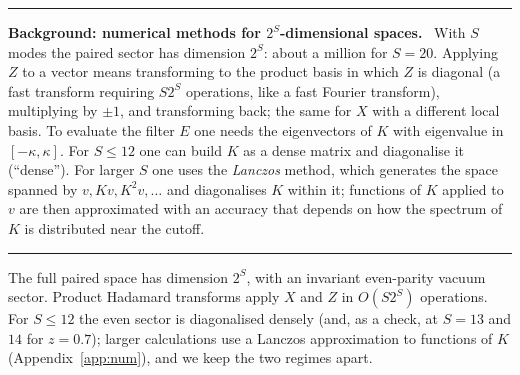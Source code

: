 \documentclass[11pt,a4paper]{article}
\newenvironment{background}[1]{\par\medskip\noindent\hrule\smallskip\noindent\textbf{Background: #1.}\ \ignorespaces}{\par\smallskip\noindent\hrule\medskip}
\begin{document}
\begin{background}{numerical methods for $2^S$-dimensional spaces}
With $S$ modes the paired sector has dimension $2^S$: about a million for $S=20$. Applying $Z$ to a vector means transforming to the product basis in which $Z$ is diagonal (a fast transform requiring $S2^S$ operations, like a fast Fourier transform), multiplying by $\pm1$, and transforming back; the same for $X$ with a different local basis. To evaluate the filter $E$ one needs the eigenvectors of $K$ with eigenvalue in $[-\kappa,\kappa]$. For $S\le12$ one can build $K$ as a dense matrix and diagonalise it (``dense''). For larger $S$ one uses the \emph{Lanczos} method, which generates the space spanned by $v, Kv, K^2v,\dots$ and diagonalises $K$ within it; functions of $K$ applied to $v$ are then approximated with an accuracy that depends on how the spectrum of $K$ is distributed near the cutoff.
\end{background}

The full paired space has dimension $2^S$, with an invariant even-parity vacuum sector. Product Hadamard transforms apply $X$ and $Z$ in $O(S2^S)$ operations. For $S\le12$ the even sector is diagonalised densely (and, as a check, at $S=13$ and $14$ for $z=0.7$); larger calculations use a Lanczos approximation to functions of $K$ (Appendix~\ref{app:num}), and we keep the two regimes apart.
\end{document}
